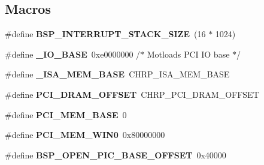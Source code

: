 \subsection*{Macros}
\begin{DoxyCompactItemize}
\item 
\mbox{\label{group__RTEMSBSPsPowerPCMVME3100_gaae9597381ef6e8194012ad0c6168cf79}} 
\#define {\bfseries B\+S\+P\+\_\+\+I\+N\+T\+E\+R\+R\+U\+P\+T\+\_\+\+S\+T\+A\+C\+K\+\_\+\+S\+I\+ZE}~(16 $\ast$ 1024)
\item 
\mbox{\label{group__RTEMSBSPsPowerPCMVME3100_gabb10b3234ab8ab0c01ae7bf8e75d9031}} 
\#define {\bfseries \+\_\+\+I\+O\+\_\+\+B\+A\+SE}~0xe0000000 /$\ast$ Motload\textquotesingle{}s P\+C\+I I\+O base $\ast$/
\item 
\mbox{\label{group__RTEMSBSPsPowerPCMVME3100_gafb361508ea9f0a1130968b947c23914e}} 
\#define {\bfseries \+\_\+\+I\+S\+A\+\_\+\+M\+E\+M\+\_\+\+B\+A\+SE}~C\+H\+R\+P\+\_\+\+I\+S\+A\+\_\+\+M\+E\+M\+\_\+\+B\+A\+SE
\item 
\mbox{\label{group__RTEMSBSPsPowerPCMVME3100_ga6d9f8ace1e46327132d0a991c6785b40}} 
\#define {\bfseries P\+C\+I\+\_\+\+D\+R\+A\+M\+\_\+\+O\+F\+F\+S\+ET}~C\+H\+R\+P\+\_\+\+P\+C\+I\+\_\+\+D\+R\+A\+M\+\_\+\+O\+F\+F\+S\+ET
\item 
\mbox{\label{group__RTEMSBSPsPowerPCMVME3100_ga4780c0ef836bde00880830140efb1024}} 
\#define {\bfseries P\+C\+I\+\_\+\+M\+E\+M\+\_\+\+B\+A\+SE}~0
\item 
\mbox{\label{group__RTEMSBSPsPowerPCMVME3100_ga058f90eef08320f95ac045ad81cf5e5a}} 
\#define {\bfseries P\+C\+I\+\_\+\+M\+E\+M\+\_\+\+W\+I\+N0}~0x80000000
\item 
\mbox{\label{group__RTEMSBSPsPowerPCMVME3100_ga5d22bb94c8864d7354bc67585b081776}} 
\#define {\bfseries B\+S\+P\+\_\+\+O\+P\+E\+N\+\_\+\+P\+I\+C\+\_\+\+B\+A\+S\+E\+\_\+\+O\+F\+F\+S\+ET}~0x40000
\item 
\mbox{\label{group__RTEMSBSPsPowerPCMVME3100_gabf20cc056288723ea02a340fc04b89bd}} 

\end{DoxyCompactItemize}
